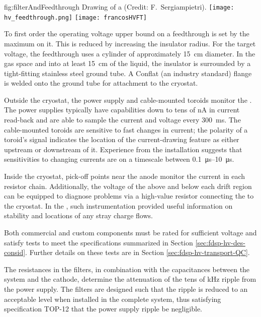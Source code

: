\begin{dunefigure}{fig:filterAndFeedthrough}
{  Drawing of a  \fdth (Credit:  F.~Sergiampietri).}
\texttt{[image: hv\_feedthrough.png]}
\texttt{[image: francosHVFT]}
\end{dunefigure}


To first order the operating voltage upper bound on a feedthrough is set by the maximum \efield{} on it. %
This \efield{} is reduced by increasing the insulator radius.  For the target voltage, the feedthrough uses a  cylinder of approximately \SI{15}{cm} diameter.  In the gas space and into at least \SI{15}{\centi\meter} of the liquid, the insulator is surrounded by a tight-fitting stainless steel ground tube.  A %
Conflat (an industry standard) flange is welded onto the ground tube for attachment to the cryostat.

Outside the cryostat, the  power supply and cable-mounted toroids monitor the .    The power supplies 
typically have capabilities down to tens of \si{\nano\ampere} in current read-back 
and are able to sample the current and voltage every \SI{300}{\ms}.  The cable-mounted toroids are sensitive to fast changes in current;  
the polarity of a toroid's signal  
indicates the location of the current-drawing feature as either upstream or downstream of it.  Experience from the  installation suggests that sensitivities to changing currents %
are on a timescale between \SIrange{0.1}{10}{\micro\s}.

Inside the cryostat, pick-off points near the anode monitor the current  
in each resistor chain.  Additionally, the voltage of the  above and below each drift region can be equipped to diagnose problems via a high-value resistor connecting the  to the cryostat.  In the , such instrumentation provided useful information on  stability and locations of %
any stray charge flows. %

Both commercial and custom  components must be rated for sufficient voltage and satisfy tests to meet the specifications %
summarized in Section \ref{sec:fdsp-hv-des-consid}.  Further details on these tests are in Section \ref{sec:fdsp-hv-transport-QC}.

The resistances in the filters, in combination with the capacitances between the  system and the cathode,
 determine the attenuation of the tens of \si{\kilo\hertz} ripple from the power supply.  The filters  
are designed such that the ripple is reduced to an acceptable level when installed in the complete system, thus satisfying specification %
TOP-12 
that the power supply ripple be negligible. %

